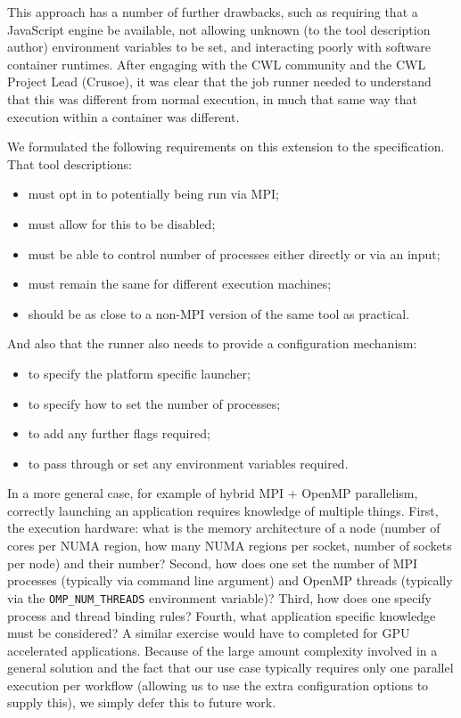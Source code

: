 \documentclass[conference]{IEEEtran}
\begin{document}
This approach has a number of further drawbacks, such as requiring that a JavaScript engine be available, not allowing unknown (to the tool description author) environment variables to be set, and interacting poorly with software container runtimes. After engaging with the CWL community and the CWL Project Lead (Crusoe), it was clear that the job runner needed to understand that this was different from normal execution, in much that same way that execution within a container was different.

We formulated the following requirements on this extension to the specification. That tool descriptions:
\begin{itemize}
    \item must opt in to potentially being run via MPI;
    \item must allow for this to be disabled;
    \item must be able to control number of processes either directly or via an input;
    \item must remain the same for different execution machines;
    \item should be as close to a non-MPI version of the same tool as practical.
\end{itemize}
And also that the runner also needs to provide a configuration mechanism:
\begin{itemize}
    \item to specify the platform specific launcher;
    \item to specify how to set the number of processes;
    \item to add any further flags required;
    \item to pass through or set any environment variables required.
\end{itemize}

In a more general case, for example of hybrid MPI + OpenMP parallelism, correctly launching an application requires knowledge of multiple things. First, the execution hardware: what is the memory architecture of a node (number of cores per NUMA region, how many NUMA regions per socket, number of sockets per node) and their number? Second, how does one set the number of MPI processes (typically via command line argument) and OpenMP threads (typically via the \verb`OMP_NUM_THREADS` environment variable)? Third, how does one specify process and thread binding rules? Fourth, what application specific knowledge must be considered? A similar exercise would have to completed for GPU accelerated applications. Because of the large amount complexity involved in a general solution and the fact that our use case typically requires only one parallel execution per workflow (allowing us to use the extra configuration options to supply this), we simply defer this to future work.
\end{document}
